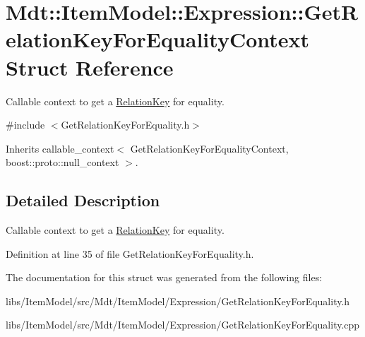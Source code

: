 \hypertarget{struct_mdt_1_1_item_model_1_1_expression_1_1_get_relation_key_for_equality_context}{}\section{Mdt\+:\+:Item\+Model\+:\+:Expression\+:\+:Get\+Relation\+Key\+For\+Equality\+Context Struct Reference}
\label{struct_mdt_1_1_item_model_1_1_expression_1_1_get_relation_key_for_equality_context}


Callable context to get a \hyperlink{class_mdt_1_1_item_model_1_1_relation_key}{Relation\+Key} for equality.  




{\ttfamily \#include $<$Get\+Relation\+Key\+For\+Equality.\+h$>$}



Inherits callable\+\_\+context$<$ Get\+Relation\+Key\+For\+Equality\+Context, boost\+::proto\+::null\+\_\+context $>$.



\subsection{Detailed Description}
Callable context to get a \hyperlink{class_mdt_1_1_item_model_1_1_relation_key}{Relation\+Key} for equality. 

Definition at line 35 of file Get\+Relation\+Key\+For\+Equality.\+h.



The documentation for this struct was generated from the following files\+:\begin{DoxyCompactItemize}
\item 
libs/\+Item\+Model/src/\+Mdt/\+Item\+Model/\+Expression/Get\+Relation\+Key\+For\+Equality.\+h\item 
libs/\+Item\+Model/src/\+Mdt/\+Item\+Model/\+Expression/Get\+Relation\+Key\+For\+Equality.\+cpp\end{DoxyCompactItemize}
